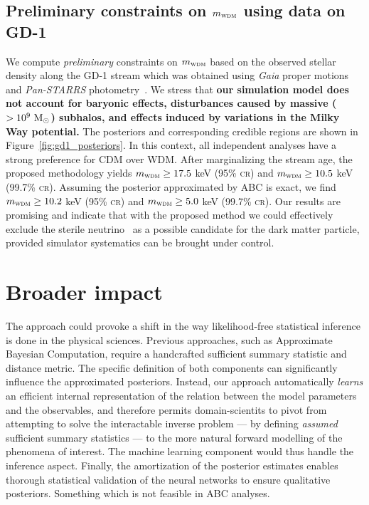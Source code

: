 \documentclass{article}
\begin{document}
\subsection{Preliminary constraints on $m_\textsc{wdm}$ using data on GD-1}
We compute \emph{preliminary} constraints on $m_\textsc{wdm}$
based on
the observed stellar density along the GD-1 stream which was obtained using \emph{Gaia} proper motions~\citep{gaia,2016A&A...595A...1G}
and \emph{Pan-STARRS} photometry~\citep{2017AAS...22922303C}.
We stress that {\bf our simulation model does not account for baryonic effects, disturbances caused by massive ($> 10^9~\textrm{M}_\odot$) subhalos, and effects induced by variations in the Milky Way potential.}
The posteriors and corresponding credible regions are shown in Figure~\ref{fig:gd1_posteriors}.
In this context, all independent analyses have a strong preference for CDM over WDM.
After marginalizing the stream age, the proposed methodology yields $m_\textsc{wdm}\geq 17.5$ keV (95\% \textsc{cr}) and $m_\textsc{wdm}\geq 10.5$ keV (99.7\% \textsc{cr}). 
Assuming the posterior approximated by ABC is exact, we find 
$m_\textsc{wdm}\geq 10.2$ keV (95\% \textsc{cr}) and $m_\textsc{wdm}\geq 5.0$ keV (99.7\% \textsc{cr}).
Our results are promising and indicate that with the proposed method we could effectively exclude the  sterile neutrino~\cite{dodelson1994sterile,shi1999new,abazajian2001sterile,asaka2005numsm,boyarsky2009role} as a possible candidate for the dark matter particle, provided simulator systematics can be brought under control.


\section*{Broader impact}
The approach could provoke a shift in the way likelihood-free statistical inference is done in the physical sciences.
Previous approaches, such as Approximate Bayesian Computation, require a handcrafted sufficient summary statistic and distance metric.
The specific definition of both components can significantly influence the approximated posteriors. Instead, our approach automatically \emph{learns} an efficient internal representation of the
relation between the model parameters and the observables, and therefore permits domain-scientits to pivot
from attempting to solve the interactable inverse problem --- by defining \emph{assumed} sufficient summary statistics --- to the more natural forward modelling of the phenomena of interest.
The machine learning component would thus handle the inference aspect.
Finally, the amortization of the posterior estimates enables thorough statistical validation of the neural networks to ensure qualitative posteriors.
Something which is not feasible in ABC analyses.
\end{document}
